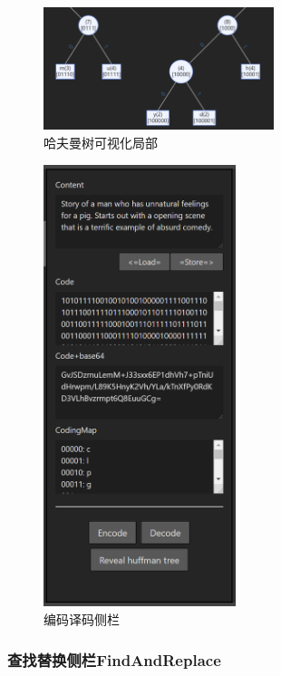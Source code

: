 \documentclass[scheme = chinese]{ctexart}
\begin{document}
\begin{figure}[h]
    \centering
    \includegraphics[width=0.6\textwidth]{images/HuffmanTree-part.png}
    \caption{哈夫曼树可视化局部}
\end{figure}

\begin{figure}[H]
    \centering
    \includegraphics[width=0.5\textwidth]{images/EncodingPanel.png}
    \caption{编码译码侧栏}
\end{figure}
\clearpage

\subsubsection{查找替换侧栏FindAndReplace}
\end{document}
